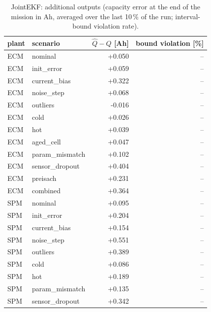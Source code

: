 \begin{table}[H]\centering\small\caption{JointEKF: additional outputs (capacity error at the end of the mission in Ah, averaged over the last 10\,\% of the run; interval-bound violation rate).}\label{tab:cellx_JointEKF}
\begin{tabular}{llrr}\toprule plant & scenario & $\hat Q - Q$ [Ah] & bound violation [\%] \\ \midrule
ECM & nominal & +0.050 & -- \\
ECM & init\_error & +0.059 & -- \\
ECM & current\_bias & +0.322 & -- \\
ECM & noise\_step & +0.068 & -- \\
ECM & outliers & -0.016 & -- \\
ECM & cold & +0.026 & -- \\
ECM & hot & +0.039 & -- \\
ECM & aged\_cell & +0.047 & -- \\
ECM & param\_mismatch & +0.102 & -- \\
ECM & sensor\_dropout & +0.404 & -- \\
ECM & preisach & +0.231 & -- \\
ECM & combined & +0.364 & -- \\
SPM & nominal & +0.095 & -- \\
SPM & init\_error & +0.204 & -- \\
SPM & current\_bias & +0.154 & -- \\
SPM & noise\_step & +0.551 & -- \\
SPM & outliers & +0.389 & -- \\
SPM & cold & +0.086 & -- \\
SPM & hot & +0.189 & -- \\
SPM & param\_mismatch & +0.135 & -- \\
SPM & sensor\_dropout & +0.342 & -- \\
\bottomrule\end{tabular}\end{table}
